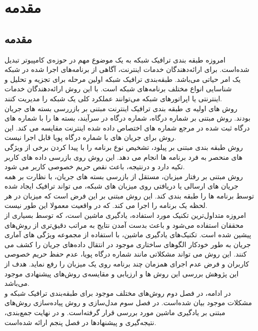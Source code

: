 \thispagestyle{empty}
\chapter{مقدمه}

\section*{مقدمه}
امروزه طبقه بندی ترافیک شبکه به یک موضوع مهم در حوزه‌ی کامپیوتر تبدیل شده‌است. برای ارائه‌دهندگان خدمات اینترنت، آگاهی از برنامه‌های اجرا شده در شبکه یک امر حیاتی می‌باشد. طبقه‌بندی ترافیک شبکه اولین مرحله برای تجزیه و تحلیل و شناسایی انواع مختلف برنامه‌های شبکه است. با این روش ارائه‌دهندگان خدمات اینترنتی یا اپراتورهای شبکه می‌توانند عملکرد کلی یک شبکه را مدیریت کنند.
\\
روش های اولیه ی طبقه بندی ترافیک اینترنت مبتنی بر بازررسی بسته های جریان بودند. روش مبتنی بر شماره درگاه، شماره درگاه در سرآیند، بسته ها را با شماره های درگاه ثبت شده در مرجع شماره های اختصاص داده شده اینترنت مقایسه می کند. این روش برای جریان های با شماره درگاه پویا قابل اجرا نیست.\cite{iana}
\\
روش طبقه بندی مبتنی بر پیلود، تشخیص نوع برنامه را با پیدا کردن برخی از ویژگی های منحصر به فرد برنامه ها انجام می دهد. این روش روی بازرسی داده های کاربر تکیه دارد و درنتیجه، باعث نقص حریم خصوصی کاربر می شود.
\\
روش مبتنی بر رفتار میزبان، مستقل از بازرسی بسته های جریان، با نظارت بر همه جریان های ارسالی یا دریافتی روی میزبان های شبکه، می تواند ترافیک ایجاد شده توسط برنامه ها را طبقه بندی کند. این روش مبتنی بر این فرض است که میزبان در هر لحظه یک برنامه را اجرا می کند. که در واقعیت معمولا این طور نیست.
\\
امروزه متداول‌ترین تکنیک مورد استفاده، یادگیری ماشین است، که توسط بسیاری از محققان استفاده می‌شود و باعث بدست آمدن نتایج به مراتب دقیق‌تری از روش‌های پیشین شده است. تکنیک‌های یادگیری ماشین، با استفاده از مجموعه ویژگی های آماری جریان به طور خودکار الگوهای ساختاری موجود در انتقال داده‌های جریان را کشف می کنند. این روش می تواند مشکلاتی مانند شماره درگاه پویا، عدم حفظ حریم خصوصی کاربران و فرض عدم اجرای همزمان چند برنامه روی یک میزبان را رفع نماید.
هدف از این پژوهش بررسی این روش ها و ارزیابی و مقایسه‌ی روش‌های پیشنهادی موجود می‌باشد.
\\
در ادامه، در فصل دوم روش‌های مختلف موجود برای طبقه‌بندی ترافیک شبکه و مشکلات موجود بیان شده‌است. در فصل سوم مدل‌سازی و روش پیاده‌سازی روش‌های مبتنی بر یادگیری ماشین مورد بررسی قرار گرفته‌است. و در نهایت جمع‌بندی، نتیجه‌گیری و پیشنهادها در فصل پنجم ارائه شده‌ا‌‌ست.
